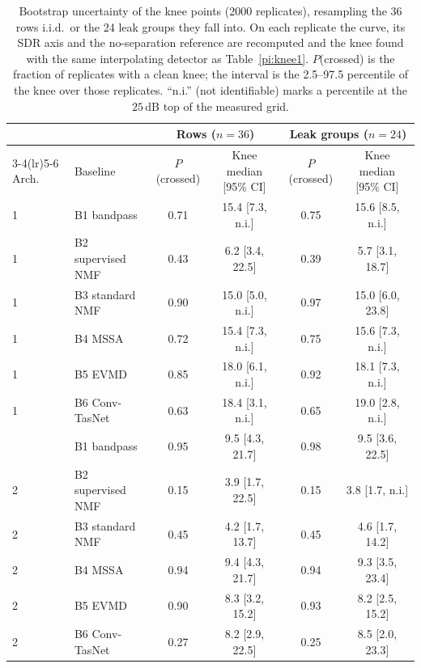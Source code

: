 \documentclass[conference]{IEEEtran}
\begin{document}
\begin{table}[htbp]
\centering
\caption{Bootstrap uncertainty of the knee points (2000 replicates), resampling the 36 rows i.i.d.\ or the 24 leak groups they fall into. On each replicate the curve, its SDR axis and the no-separation reference are recomputed and the knee found with the same interpolating detector as Table~\ref{pi:knee1}. $P$(crossed) is the fraction of replicates with a clean knee; the interval is the 2.5--97.5 percentile of the knee over those replicates. ``n.i.'' (not identifiable) marks a percentile at the $25$\,dB top of the measured grid.}
\label{pi:kneeboot}
\small
\begin{tabular}{@{}llcccc@{}}
\toprule
 & & \multicolumn{2}{c}{Rows ($n{=}36$)} & \multicolumn{2}{c}{Leak groups ($n{=}24$)} \\
\cmidrule(lr){3-4}\cmidrule(lr){5-6}
Arch.\ & Baseline & $P$(crossed) & Knee median [95\% CI] & $P$(crossed) & Knee median [95\% CI] \\
\midrule
1 & B1 bandpass       & 0.71 & 15.4 [7.3, n.i.] & 0.75 & 15.6 [8.5, n.i.] \\
1 & B2 supervised NMF & 0.43 & 6.2 [3.4, 22.5]  & 0.39 & 5.7 [3.1, 18.7] \\
1 & B3 standard NMF   & 0.90 & 15.0 [5.0, n.i.] & 0.97 & 15.0 [6.0, 23.8] \\
1 & B4 MSSA           & 0.72 & 15.4 [7.3, n.i.] & 0.75 & 15.6 [7.3, n.i.] \\
1 & B5 EVMD           & 0.85 & 18.0 [6.1, n.i.] & 0.92 & 18.1 [7.3, n.i.] \\
1 & B6 Conv-TasNet    & 0.63 & 18.4 [3.1, n.i.] & 0.65 & 19.0 [2.8, n.i.] \\
\addlinespace
2 & B1 bandpass       & 0.95 & 9.5 [4.3, 21.7]  & 0.98 & 9.5 [3.6, 22.5] \\
2 & B2 supervised NMF & 0.15 & 3.9 [1.7, 22.5]  & 0.15 & 3.8 [1.7, n.i.] \\
2 & B3 standard NMF   & 0.45 & 4.2 [1.7, 13.7]  & 0.45 & 4.6 [1.7, 14.2] \\
2 & B4 MSSA           & 0.94 & 9.4 [4.3, 21.7]  & 0.94 & 9.3 [3.5, 23.4] \\
2 & B5 EVMD           & 0.90 & 8.3 [3.2, 15.2]  & 0.93 & 8.2 [2.5, 15.2] \\
2 & B6 Conv-TasNet    & 0.27 & 8.2 [2.9, 22.5]  & 0.25 & 8.5 [2.0, 23.3] \\
\bottomrule
\end{tabular}
\end{table}
\end{document}

